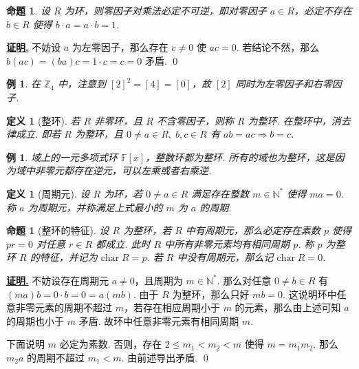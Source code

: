 \documentclass[10pt,openany]{article}
\theoremstyle{thmstyle} %
\theoremstyle{defstyle} %
\newtheorem{definition}[theorem]{定义}
\theoremstyle{prostyle} %
\newtheorem{proposition}[theorem]{命题}
\theoremstyle{exastyle}
\newtheorem{example}[theorem]{例}
\theoremstyle{remstyle}
\renewenvironment{proof}[1][证明]{\par\underline{\textbf{#1.}} \;\fangsong}{\qed\par}
\newcommand{\F}{\mathbb{F}}
\newcommand{\tz}{\mathrm{char} \;}
\begin{document}
\begin{proposition}
	设 \( R \) 为环，则零因子对乘法必定不可逆，即对零因子 \( a \in R \)，必定不存在 \( b \in R \) 使得 \( b \cdot a=a \cdot b=1 \).
\end{proposition}

\begin{proof}
	不妨设 \( a \) 为左零因子，那么存在 \( c \neq 0 \) 使 \( ac=0 \). 若结论不然，那么 \( b(ac)=(ba)c=1 \cdot c=c=0 \) 矛盾.
\end{proof}

\begin{example}
	在 \( \mathbb{Z}_4 \) 中，注意到 \( [2]^2=[4]=[0] \)，故 \( [2] \) 同时为左零因子和右零因子. 
\end{example}

\begin{definition}[整环]
	若 \( R \) 非零环，且 \( R \) 不含零因子，则称 \( R \) 为整环. 在整环中，消去律成立. 即若 \( R \) 为整环，且 \( 0 \neq a \in R, \; b,c \in R \) 有 \(ab=ac \Rightarrow b=c \).
\end{definition}

\begin{example}
	域上的一元多项式环 \( \F[x] \)，整数环都为整环. 所有的域也为整环，这是因为域中非零元都存在逆元，可以左乘或者右乘逆.
\end{example}

\begin{definition}[周期元]
	设 \( R \) 为环，若 \( 0 \neq a \in R \) 满足存在整数 \( m \in \mathbb{N}^* \) 使得 \( ma=0 \). 称 \( a \) 为周期元，并称满足上式最小的 \( m \) 为 \( a \) 的周期. 
\end{definition}

\begin{proposition}[整环的特征]
	设 \( R \) 为整环，若 \( R \) 中有周期元，那么必定存在素数 \( p \) 使得 \( pr=0 \) 对任意 \( r \in R \) 都成立. 此时 \( R \) 中所有非零元素均有相同周期 \( p \). 称 \( p \) 为整环 \( R \) 的特征，并记为 \( \tz  R=p \). 若 \( R \) 中没有周期元，那么记 \( \tz  R=0 \).
	\label{1.2.24}
\end{proposition}

\begin{proof}
	不妨设存在周期元 \( a \neq 0 \)，且周期为 \( m \in \mathbb{N}^* \). 那么对任意 \( 0 \neq b \in R \) 有 \( (ma)b=0 \cdot b=0=a(mb) \). 由于 \( R \) 为整环，那么只好 \( mb=0 \). 这说明环中任意非零元素的周期不超过 \( m \)，若存在相应周期小于 \( m \) 的元素，那么由上述可知 \( a \) 的周期也小于 \( m \) 矛盾. 故环中任意非零元素有相同周期 \( m \).
	
	下面说明 \( m \) 必定为素数. 否则，存在 \( 2 \leq m_1<m_2<m \) 使得 \( m=m_1m_2 \). 那么 \( m_2a \) 的周期不超过 \( m_1<m \). 由前述导出矛盾. 
\end{proof}
\end{document}
